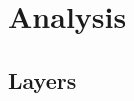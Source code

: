 \chapter{Analysis}
\label{ch:analysis}


\newcommand{\EAA}{Patterns of Enterprise Application Architecture}

%
%
%
%
%
%
%
%

\section{Layers}

